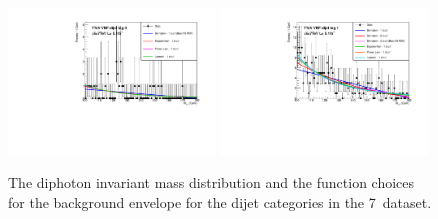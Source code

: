 \begin{figure}
  \includegraphics[width=0.49\textwidth]{analysis/plots/multipdf_plots/cat4_7TeV.pdf}
  \includegraphics[width=0.49\textwidth]{analysis/plots/multipdf_plots/cat5_7TeV.pdf}\\
  \caption{The diphoton invariant mass distribution and the function choices for the background envelope for the dijet categories in the 7~\TeV dataset.}
  \label{fig:multipdf2}
\end{figure}

